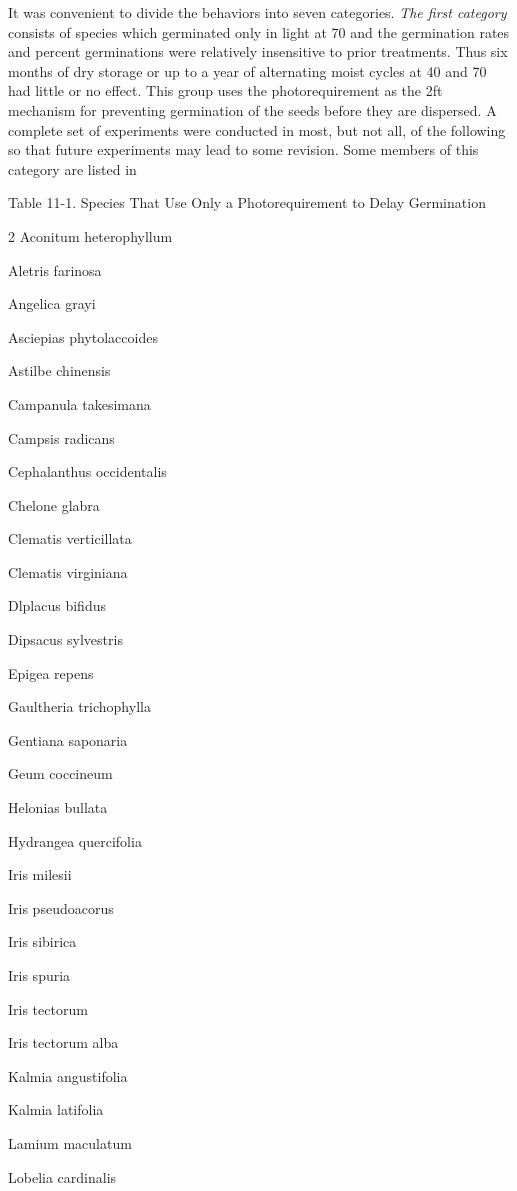 It was convenient to divide the behaviors into seven categories. \textit{The first
category} consists of species which germinated only in light at 70 and the germination
rates and percent germinations were relatively insensitive to prior treatments. Thus six
months of dry storage or up to a year of alternating moist cycles at 40 and 70 had little
or no effect. This group uses the photorequirement as the 2ft mechanism for
preventing germination of the seeds before they are dispersed. A complete set of
experiments were conducted in most, but not all, of the following so that future
experiments may lead to some revision. Some members of this category are listed in

Table 11-1. Species That Use Only a Photorequirement to Delay Germination

\begin{multicols}{2}
Aconitum heterophyllum

Aletris farinosa

Angelica grayi

Asciepias phytolaccoides

Astilbe chinensis

Campanula takesimana

Campsis radicans

Cephalanthus occidentalis

Chelone glabra

Clematis verticillata

Clematis virginiana

Dlplacus bifidus

Dipsacus sylvestris

Epigea repens

Gaultheria trichophylla

Gentiana saponaria

Geum coccineum

Helonias bullata

Hydrangea quercifolia

Iris milesii

Iris pseudoacorus

Iris sibirica

Iris spuria

Iris tectorum

Iris tectorum alba

Kalmia angustifolia

Kalmia latifolia

Lamium maculatum

Lobelia cardinalis


\end{multicols}

